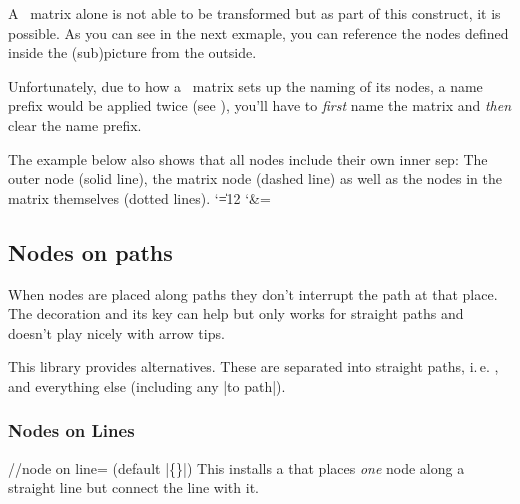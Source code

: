 \begin{multicols}{2}
\newcolumn

A \pgfname\ matrix alone is not able to be transformed but
as part of this construct, it is possible.
As you can see in the next exmaple,
you can reference the nodes defined inside the (sub)picture
from the outside.

Unfortunately, due to how a \tikzname\ matrix sets up the
naming of its nodes, a name prefix would be applied twice (see \cite{MatrixNamePrefix}),
you'll have to \emph{first} name the matrix and \emph{then} clear the name prefix.

The example below also shows that
all nodes include their own inner sep:
The outer node (solid line),
the matrix node (dashed line)
as well as the nodes in the matrix themselves (dotted lines).
\begingroup
\catcode`\|=12
\catcode`\&=\active\relax
\begin{codeexample}[preamble=\usetikzlibrary{ext.nodes, matrix}]
\end{codeexample}
\endgroup
\newcolumn

\subsection{Nodes on paths}
When nodes are placed along paths they don't interrupt
the path at that place.
The decoration 
and its 
key can help but only works for straight paths and
doesn't play nicely with arrow tips.

This library provides alternatives.
These are separated into straight paths, i.\,e. ,
and everything else (including any |to path|).

\subsubsection{Nodes on Lines}

\begin{stylekey}{/\tikzext/node on line= (default |\{\}|)}
This installs a  that places \emph{one}
node along a straight line but connect the line with it.


\end{stylekey}
\end{multicols}
